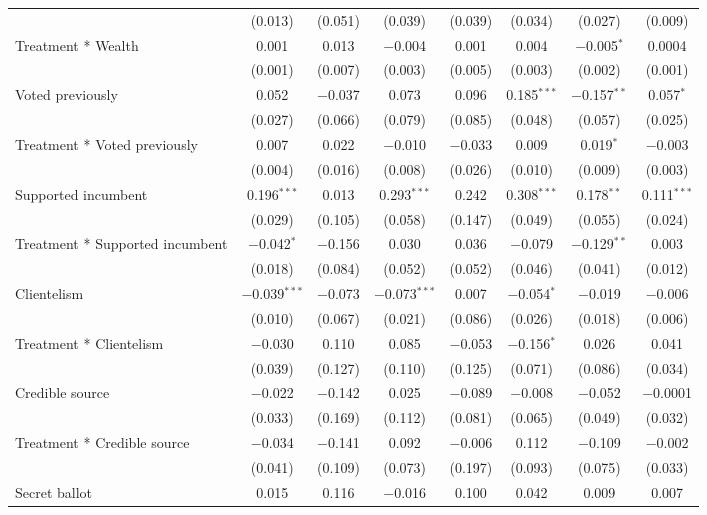 \begin{table}[H]
{\begin{tabular}{@{\extracolsep{1pt}}lccccccc}
  & (0.013) & (0.051) & (0.039) & (0.039) & (0.034) & (0.027) & (0.009) \\ 
  Treatment * Wealth & 0.001 & 0.013 & $-$0.004 & 0.001 & 0.004 & $-$0.005$^{*}$ & 0.0004 \\ 
  & (0.001) & (0.007) & (0.003) & (0.005) & (0.003) & (0.002) & (0.001) \\ 
  Voted previously & 0.052 & $-$0.037 & 0.073 & 0.096 & 0.185$^{***}$ & $-$0.157$^{**}$ & 0.057$^{*}$ \\ 
  & (0.027) & (0.066) & (0.079) & (0.085) & (0.048) & (0.057) & (0.025) \\ 
  Treatment * Voted previously & 0.007 & 0.022 & $-$0.010 & $-$0.033 & 0.009 & 0.019$^{*}$ & $-$0.003 \\ 
  & (0.004) & (0.016) & (0.008) & (0.026) & (0.010) & (0.009) & (0.003) \\ 
  Supported incumbent & 0.196$^{***}$ & 0.013 & 0.293$^{***}$ & 0.242 & 0.308$^{***}$ & 0.178$^{**}$ & 0.111$^{***}$ \\ 
  & (0.029) & (0.105) & (0.058) & (0.147) & (0.049) & (0.055) & (0.024) \\ 
  Treatment * Supported incumbent & $-$0.042$^{*}$ & $-$0.156 & 0.030 & 0.036 & $-$0.079 & $-$0.129$^{**}$ & 0.003 \\ 
  & (0.018) & (0.084) & (0.052) & (0.052) & (0.046) & (0.041) & (0.012) \\ 
  Clientelism & $-$0.039$^{***}$ & $-$0.073 & $-$0.073$^{***}$ & 0.007 & $-$0.054$^{*}$ & $-$0.019 & $-$0.006 \\ 
  & (0.010) & (0.067) & (0.021) & (0.086) & (0.026) & (0.018) & (0.006) \\ 
  Treatment * Clientelism & $-$0.030 & 0.110 & 0.085 & $-$0.053 & $-$0.156$^{*}$ & 0.026 & 0.041 \\ 
  & (0.039) & (0.127) & (0.110) & (0.125) & (0.071) & (0.086) & (0.034) \\ 
  Credible source & $-$0.022 & $-$0.142 & 0.025 & $-$0.089 & $-$0.008 & $-$0.052 & $-$0.0001 \\ 
  & (0.033) & (0.169) & (0.112) & (0.081) & (0.065) & (0.049) & (0.032) \\ 
  Treatment * Credible source & $-$0.034 & $-$0.141 & 0.092 & $-$0.006 & 0.112 & $-$0.109 & $-$0.002 \\ 
  & (0.041) & (0.109) & (0.073) & (0.197) & (0.093) & (0.075) & (0.033) \\ 
  Secret ballot & 0.015 & 0.116 & $-$0.016 & 0.100 & 0.042 & 0.009 & 0.007 \\ 

\end{tabular}}
\end{table}
